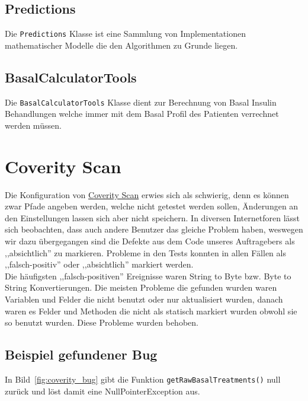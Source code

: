 \documentclass[accentcolor=tud0b,12pt,paper=a4]{tudreport}
\begin{document}
\subsection{Predictions}
Die \texttt{Predictions} Klasse ist eine Sammlung von Implementationen mathematischer Modelle die den Algorithmen zu Grunde liegen.


\subsection{BasalCalculatorTools}
Die \texttt{BasalCalculatorTools} Klasse dient zur Berechnung von Basal Insulin Behandlungen welche immer mit dem Basal Profil des Patienten verrechnet werden müssen.


\section{Coverity Scan}
Die Konfiguration von \href{https://scan.coverity.com/projects/tuda-bp-11-opendiabetes-uam-heuristik}{Coverity Scan} erwies sich als schwierig, denn es können zwar Pfade angeben werden, welche nicht getestet werden sollen, Änderungen an den Einstellungen lassen sich aber nicht speichern. In diversen Internetforen lässt sich beobachten, dass auch andere Benutzer das gleiche Problem haben, weswegen wir dazu übergegangen sind die Defekte aus dem Code unseres Auftragebers als ,,absichtlich'' zu markieren. Probleme in den Tests konnten in allen Fällen als ,,falsch-positiv'' oder ,,absichtlich'' markiert werden.\\
Die häufigsten ,,falsch-positiven'' Ereignisse waren String to Byte bzw. Byte to String Konvertierungen.
Die meisten Probleme die gefunden wurden waren Variablen und Felder die nicht benutzt oder nur aktualisiert wurden, danach waren es Felder und Methoden die nicht als statisch markiert wurden obwohl sie so benutzt wurden. Diese Probleme wurden behoben.

\subsection{Beispiel gefundener Bug}
\label{sec:coverity_bug}
In Bild~\ref{fig:coverity_bug} gibt die Funktion \texttt{getRawBasalTreatments()} null zurück und löst damit eine NullPointerException aus.
\end{document}
